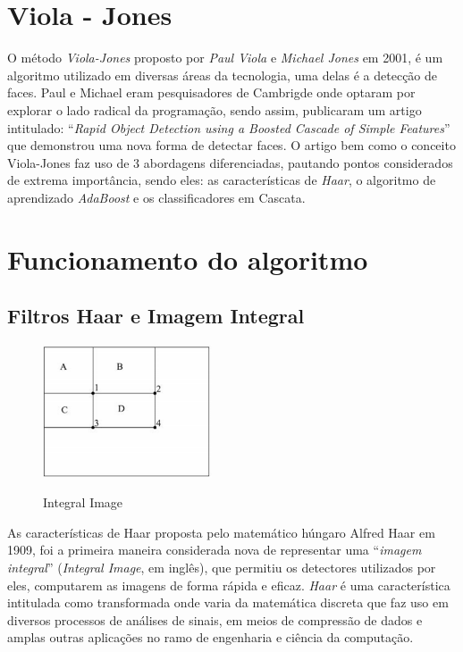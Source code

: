 \documentclass[12pt,a4paper]{article}
\begin{document}
\section{Viola - Jones}
O método \textit{Viola-Jones} proposto por \textit{Paul Viola} e \textit{Michael Jones} em 2001, é um algoritmo utilizado em diversas áreas da tecnologia, uma delas é a detecção de faces. Paul e Michael eram pesquisadores de Cambrigde onde optaram por explorar o lado radical da programação, sendo assim, publicaram um artigo intitulado: “\textit{Rapid Object Detection using a Boosted Cascade of Simple Features}” que demonstrou uma nova forma de detectar faces. O artigo bem como o conceito Viola-Jones faz uso de 3 abordagens diferenciadas, pautando pontos considerados de extrema importância, sendo eles: as características de \textit{Haar}, o algoritmo de aprendizado \textit{AdaBoost} e os classificadores em Cascata.

\section{Funcionamento do algoritmo} 

\subsection{Filtros Haar e Imagem Integral}


\begin{figure}[h!]
\centering
\includegraphics[width=5cm]{recursos/imagens/Integral.png}
\label{4}
\caption{Integral Image}
\end{figure} 

As características de Haar proposta pelo matemático húngaro Alfred Haar em 1909, foi a primeira maneira considerada nova de representar uma “\textit{imagem integral}” (\textit{Integral Image}, em inglês), que permitiu os detectores utilizados por eles, computarem as imagens de forma rápida e eficaz. \textit{Haar} é uma característica intitulada como transformada onde varia da matemática discreta que faz uso em diversos processos de análises de sinais, em meios de compressão de dados e amplas outras aplicações no ramo de engenharia e ciência da computação.
\end{document}
